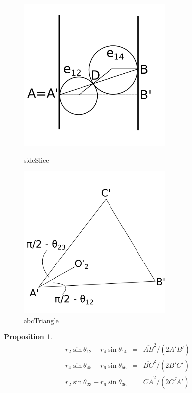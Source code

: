 \documentclass[suppldata, dvipdfmx]{interact}
\theoremstyle{plain}%
\newtheorem{proposition}[theorem]{Proposition}
\theoremstyle{definition}
\theoremstyle{remark}
\theoremstyle{problemstyle}
\begin{document}
\begin{figure}[h!tbp]
 \begin{minipage}[t]{0.5\textwidth}
 \centering
 \includegraphics[width=3in, height=3in,
 keepaspectratio]{./img/HexahedraWithSphericalFaces/sideSlice.png}
 \caption{sideSlice}
 \label{fig:sideSlice}
 \end{minipage}
 \hspace*{\fill}
 \begin{minipage}[t]{0.5\textwidth}
  \centering
  \includegraphics[width=3in, height=3in,
  keepaspectratio]{./img/HexahedraWithSphericalFaces/abcTriangle.png}
  \caption{abcTriangle}
  \label{fig:sideSlice}
 \end{minipage}
 \hspace*{\fill}
\end{figure}

\begin{proposition}\label{angles}
 \begin{eqnarray}
 r_2\sin\theta_{12} + r_4\sin\theta_{14} &=& \overline{AB}^2 / (2\overline{A'B'})\\
 r_4\sin\theta_{45} + r_6\sin\theta_{56} &=& \overline{BC}^2 / (2\overline{B'C'})\\
 r_2\sin\theta_{23} + r_6\sin\theta_{36} &=& \overline{CA}^2 / (2\overline{C'A'})
 \end{eqnarray}
\end{proposition}
\end{document}
